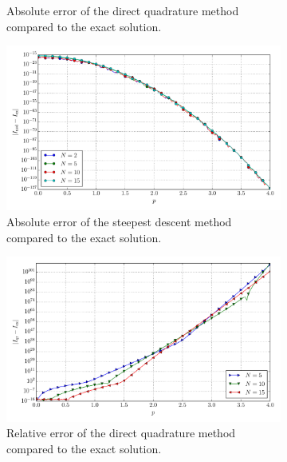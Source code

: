 \documentclass[a4paper,10pt]{article}
\begin{document}
\begin{figure}[ht!]
\begin{subfigure}[t]{0.5\linewidth}
    \caption{Absolute error of the direct quadrature method compared to the exact solution.}
    \label{fig:tp_4d_conv_p_0000_0000_err_qr}
  \end{subfigure}
  \begin{subfigure}[t]{0.5\linewidth}
    \includegraphics[width=\linewidth]{./plots/tp_4d_conv_p_(0,0,0,0)_(0,0,0,0)_err_nsd.pdf}
    \caption{Absolute error of the steepest descent method compared to the exact solution.}
    \label{fig:tp_4d_conv_p_0000_0000_err_nsd}
  \end{subfigure}
  \begin{subfigure}[t]{0.5\linewidth}
    \includegraphics[width=\linewidth]{./plots/tp_4d_conv_p_(0,0,0,0)_(0,0,0,0)_err_rel_qr.pdf}
    \caption{Relative error of the direct quadrature method compared to the exact solution.}
    \label{fig:tp_4d_conv_p_0000_0000_err_rel_qr}
  \end{subfigure}
  \begin{subfigure}[t]{0.5\linewidth}

\end{subfigure}
\end{figure}
\end{document}
